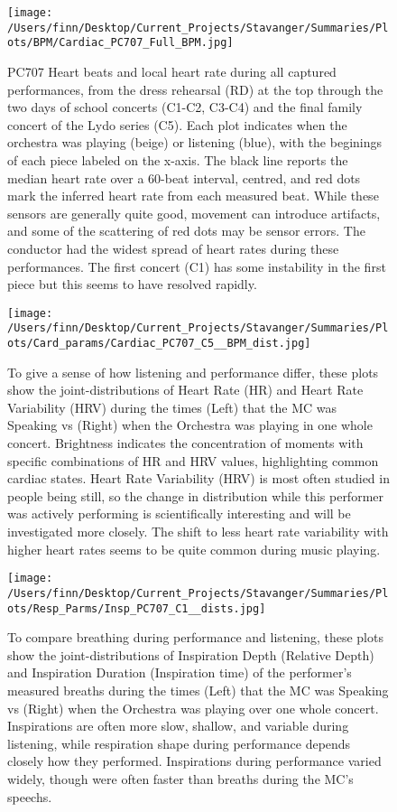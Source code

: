 \begin{figure}[h]
\begin{center}
\texttt{[image: /Users/finn/Desktop/Current\_Projects/Stavanger/Summaries/Plots/BPM/Cardiac\_PC707\_Full\_BPM.jpg]}
\caption{PC707 Heart beats and local heart rate during all captured performances, from the dress rehearsal (RD) at the top through the two days of school concerts (C1-C2, C3-C4) and the final family concert of the Lydo series (C5).  Each plot indicates when the orchestra was playing (beige) or listening (blue), with the beginings of each piece labeled on the x-axis.  The black line reports the median heart rate over a 60-beat interval, centred, and red dots mark the inferred heart rate from each measured beat. While these sensors are generally quite good, movement can introduce artifacts, and some of the scattering of red dots may be sensor errors. The conductor had the widest spread of heart rates during these performances. The first concert (C1) has some instability in the first piece but this seems to have resolved rapidly.}
\label{BPM}
\end{center}
\end{figure}
\begin{figure}[h]
\begin{center}
\texttt{[image: /Users/finn/Desktop/Current\_Projects/Stavanger/Summaries/Plots/Card\_params/Cardiac\_PC707\_C5\_\_BPM\_dist.jpg]}
\caption{To give a sense of how listening and performance differ, these plots show the joint-distributions of Heart Rate (HR) and Heart Rate Variability (HRV) during the times (Left) that the MC was Speaking vs (Right) when the Orchestra was playing in one whole concert.  Brightness indicates the concentration of moments with specific combinations of HR and HRV values, highlighting common cardiac states.  Heart Rate Variability (HRV) is most often studied in people being still, so the change in distribution while this performer was actively performing is scientifically interesting and will be investigated more closely. The shift to less heart rate variability with higher heart rates seems to be quite common during music playing.}
\label{HRV}
\end{center}
\end{figure}
\begin{figure}[h]
\begin{center}
\texttt{[image: /Users/finn/Desktop/Current\_Projects/Stavanger/Summaries/Plots/Resp\_Parms/Insp\_PC707\_C1\_\_dists.jpg]}
\caption{To compare breathing during performance and listening, these plots show the joint-distributions of Inspiration Depth (Relative Depth) and Inspiration Duration (Inspiration time) of the performer's measured breaths during the times (Left) that the MC was Speaking vs (Right) when the Orchestra was playing over one whole concert.  Inspirations are often more slow, shallow, and variable during listening, while respiration shape during performance depends closely how they performed. Inspirations during performance varied widely, though were often faster than breaths during the MC's speechs. }
\label{resp}
\end{center}
\end{figure}
